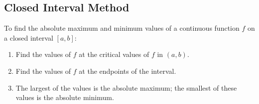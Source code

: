 \subsection*{Closed Interval Method}

To find the absolute maximum and minimum values of a continuous function \(f\) on a closed interval \([a, b]\):
\begin{enumerate}
    \item Find the values of \(f\) at the critical values of \(f\) in \((a, b)\).
    \item Find the values of \(f\) at the endpoints of the interval.
    \item The largest of the values is the absolute maximum; the smallest of these values is the absolute minimum.
\end{enumerate}
